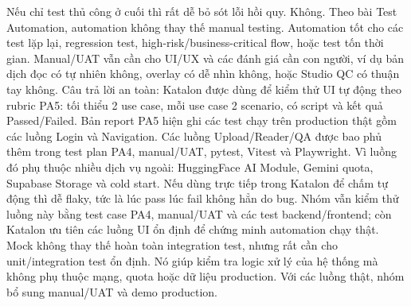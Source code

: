 {}Nếu chỉ test thủ công ở cuối thì rất dễ bỏ sót lỗi hồi quy.\markdownRendererInterblockSeparator
{}
\markdownRendererSectionEnd \markdownRendererSectionBegin
{}\markdownRendererInterblockSeparator
{}Không. Theo bài Test Automation, automation không thay thế manual testing. Automation tốt cho các test lặp lại, regression test, high-risk/business-critical flow, hoặc test tốn thời gian.\markdownRendererParagraphSeparator
{}Manual/UAT vẫn cần cho UI/UX và các đánh giá cần con người, ví dụ bản dịch đọc có tự nhiên không, overlay có dễ nhìn không, hoặc Studio QC có thuận tay không.\markdownRendererInterblockSeparator
{}
\markdownRendererSectionEnd \markdownRendererSectionBegin
{}\markdownRendererInterblockSeparator
{}Câu trả lời an toàn:\markdownRendererParagraphSeparator
{}Katalon được dùng để kiểm thử UI tự động theo rubric PA5: tối thiểu 2 use case, mỗi use case 2 scenario, có script và kết quả Passed/Failed.\markdownRendererParagraphSeparator
{}Bản report PA5 hiện ghi các test chạy trên production thật gồm các luồng Login và Navigation. Các luồng Upload/Reader/Q\markdownRendererAmpersand{}A được bao phủ thêm trong test plan PA4, manual/UAT, pytest, Vitest và Playwright.\markdownRendererInterblockSeparator
{}
\markdownRendererSectionEnd \markdownRendererSectionBegin
{}\markdownRendererInterblockSeparator
{}Vì luồng đó phụ thuộc nhiều dịch vụ ngoài: HuggingFace AI Module, Gemini quota, Supabase Storage và cold start. Nếu dùng trực tiếp trong Katalon để chấm tự động thì dễ flaky, tức là lúc pass lúc fail không hẳn do bug.\markdownRendererParagraphSeparator
{}Nhóm vẫn kiểm thử luồng này bằng test case PA4, manual/UAT và các test backend/frontend; còn Katalon ưu tiên các luồng UI ổn định để chứng minh automation chạy thật.\markdownRendererInterblockSeparator
{}
\markdownRendererSectionEnd \markdownRendererSectionBegin
{}\markdownRendererInterblockSeparator
{}Mock không thay thế hoàn toàn integration test, nhưng rất cần cho unit/integration test ổn định.\markdownRendererParagraphSeparator
{}Nó giúp kiểm tra logic xử lý của hệ thống mà không phụ thuộc mạng, quota hoặc dữ liệu production. Với các luồng thật, nhóm bổ sung manual/UAT và demo production.\markdownRendererInterblockSeparator
{}
\markdownRendererSectionEnd \markdownRendererSectionBegin
{}\markdownRendererInterblockSeparator
